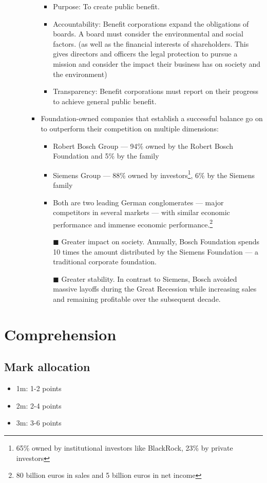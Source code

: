 \documentclass[oneside]{book}
\begin{document}
\begin{enumerate}
\begin{itemize}
\begin{itemize}
\begin{itemize}
                \item Purpose: To create public benefit. 
                \item Accountability: Benefit corporations expand the obligations of boards. A board must consider the environmental and social factors. (as well as the financial interests of shareholders. This gives directors and officers the legal protection to pursue a mission and consider the impact their business has on society and the environment)
                \item Transparency: Benefit corporations must report on their progress to achieve general public benefit.
            \end{itemize}
            \item Foundation-owned companies that establish a successful balance go on to outperform their competition on multiple dimensions: 
            \begin{itemize}
                \item Robert Bosch Group --- 94\% owned by the Robert Bosch Foundation and 5\% by the family
                \item Siemens Group --- 88\% owned by investors\footnote{65\% owned by institutional investors like BlackRock, 23\% by private investors}, 6\% by the Siemens family 
                \item Both are two leading German conglomerates --- major competitors in several markets --- with similar economic performance and immense economic performance.\footnote{80 billion euros in sales and 5 billion euros in net income}
                \item[\(\blacksquare\)] Greater impact on society. Annually, Bosch Foundation spends 10 times the amount distributed by the Siemens Foundation --- a traditional corporate foundation.
                \item[\(\blacksquare\)] Greater stability. In contrast to Siemens, Bosch avoided massive layoffs during the Great Recession while increasing sales and remaining profitable over the subsequent decade. 
            \end{itemize}
        \end{itemize}
    \end{itemize}
\end{enumerate}
\chapter{Comprehension}
\section{Mark allocation}
\begin{itemize}
    \item 1m: 1-2 points
    \item 2m: 2-4 points
    \item 3m: 3-6 points
\end{itemize}
\end{document}
